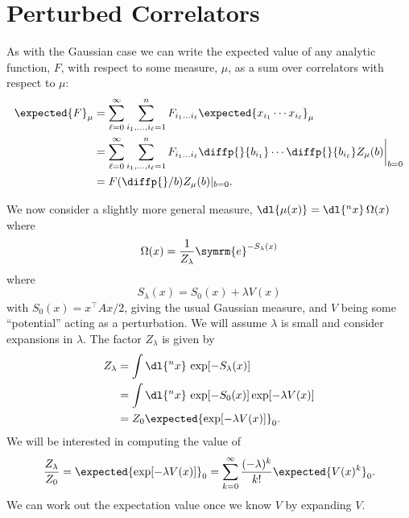 \documentclass[fleqn]{NotesClass}
\newcommand{\e}{\symrm{e}}
\newcommand{\trans}{{\top}}
\begin{document}
    \section{Perturbed Correlators}
    As with the Gaussian case we can write the expected value of any analytic function, \(F\), with respect to some measure, \(\mu\), as a sum over correlators with respect to \(\mu\):
    \begin{align}
        \expected{F}_\mu &= \sum_{\ell = 0}^{\infty} \sum_{i_1, \dotsc, i_\ell = 1}^{n} F_{i_1\dotso i_{\ell}} \expected{x_{i_1} \dotsm x_{i_\ell}}_\mu\\
        &= \sum_{\ell = 0}^{\infty} \sum_{i_1, \dotsc, i_{\ell} = 1}^{n} F_{i_1\dotso i_\ell} \diffp{}{b_{i_1}} \dotsm \diffp{}{b_{i_\ell}} Z_\mu(b) \bigg|_{b = 0}\\
        &= F(\diffp{}/{b}) Z_\mu(b)|_{b = 0}.
    \end{align}
    
    We now consider a slightly more general measure, \(\dl{\mu(x)} = \dl{^nx} \,\Omega(x)\) where
    \begin{equation}
        \Omega(x) = \frac{1}{Z_\lambda} \e^{-S_\lambda(x)}
    \end{equation}
    where
    \begin{equation}
        S_\lambda(x) = S_0(x) + \lambda V(x)
    \end{equation}
    with \(S_0(x) = x^\trans Ax/2\), giving the usual Gaussian measure, and \(V\) being some \enquote{potential} acting as a perturbation.
    We will assume \(\lambda\) is small and consider expansions in \(\lambda\).
    The factor \(Z_\lambda\) is given by
    \begin{align}
        Z_\lambda &= \int \dl{^nx}  \, \exp[-S_\lambda(x)]\\
        &= \int \dl{^nx} \, \exp[-S_0(x)]\exp[-\lambda V(x)]\\
        &= Z_0 \expected{\exp[-\lambda V(x)]}_0.
    \end{align}
    We will be interested in computing the value of
    \begin{equation}
        \frac{Z_\lambda}{Z_0} = \expected{\exp[-\lambda V(x)]}_0 = \sum_{k = 0}^{\infty} \frac{(-\lambda)^k}{k!} \expected{V(x)^k}_0.
    \end{equation}
    We can work out the expectation value once we know \(V\) by expanding \(V\).
    
\end{document}
